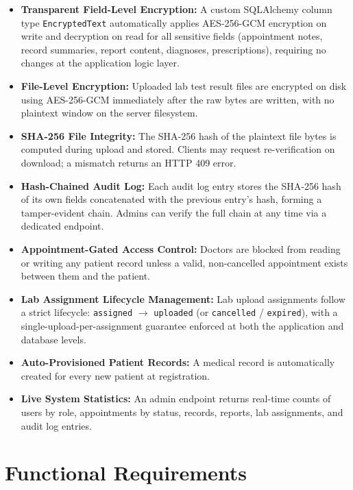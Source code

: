 \documentclass[a4paper,12pt]{report}
\begin{document}
\begin{itemize}
    \item \textbf{Transparent Field-Level Encryption:} A custom SQLAlchemy column type \texttt{EncryptedText} automatically applies AES-256-GCM encryption on write and decryption on read for all sensitive fields (appointment notes, record summaries, report content, diagnoses, prescriptions), requiring no changes at the application logic layer.
    \item \textbf{File-Level Encryption:} Uploaded lab test result files are encrypted on disk using AES-256-GCM immediately after the raw bytes are written, with no plaintext window on the server filesystem.
    \item \textbf{SHA-256 File Integrity:} The SHA-256 hash of the plaintext file bytes is computed during upload and stored. Clients may request re-verification on download; a mismatch returns an HTTP 409 error.
    \item \textbf{Hash-Chained Audit Log:} Each audit log entry stores the SHA-256 hash of its own fields concatenated with the previous entry's hash, forming a tamper-evident chain. Admins can verify the full chain at any time via a dedicated endpoint.
    \item \textbf{Appointment-Gated Access Control:} Doctors are blocked from reading or writing any patient record unless a valid, non-cancelled appointment exists between them and the patient.
    \item \textbf{Lab Assignment Lifecycle Management:} Lab upload assignments follow a strict lifecycle: \texttt{assigned} $\rightarrow$ \texttt{uploaded} (or \texttt{cancelled} / \texttt{expired}), with a single-upload-per-assignment guarantee enforced at both the application and database levels.
    \item \textbf{Auto-Provisioned Patient Records:} A medical record is automatically created for every new patient at registration.
    \item \textbf{Live System Statistics:} An admin endpoint returns real-time counts of users by role, appointments by status, records, reports, lab assignments, and audit log entries.
\end{itemize}

\section{Functional Requirements}
\end{document}
